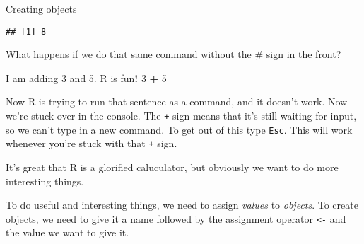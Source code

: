 \documentclass[
  11pt,
  ignorenonframetext,
]{beamer}
\newenvironment{Shaded}{\begin{snugshade}}{\end{snugshade}}
\newcommand{\DecValTok}[1]{\textcolor[rgb]{0.00,0.00,0.81}{#1}}
\newcommand{\FloatTok}[1]{\textcolor[rgb]{0.00,0.00,0.81}{#1}}
\newcommand{\NormalTok}[1]{#1}
\newcommand{\OperatorTok}[1]{\textcolor[rgb]{0.81,0.36,0.00}{\textbf{#1}}}
\newcommand{\StringTok}[1]{\textcolor[rgb]{0.31,0.60,0.02}{#1}}
\begin{document}
\begin{frame}[fragile]{Creating objects}
\begin{verbatim}
## [1] 8
\end{verbatim}

What happens if we do that same command without the \# sign in the
front?

\begin{Shaded}
\begin{Highlighting}[]
\NormalTok{I am adding }\DecValTok{3}\NormalTok{ and }\FloatTok{5.}\NormalTok{ R is fun}\OperatorTok{!}
\DecValTok{3} \OperatorTok{+}\StringTok{ }\DecValTok{5}
\end{Highlighting}
\end{Shaded}

Now R is trying to run that sentence as a command, and it doesn't work.
Now we're stuck over in the console. The \texttt{+} sign means that it's
still waiting for input, so we can't type in a new command. To get out
of this type \texttt{Esc}. This will work whenever you're stuck with
that \texttt{+} sign.

It's great that R is a glorified caluculator, but obviously we want to
do more interesting things.

To do useful and interesting things, we need to assign \emph{values} to
\emph{objects}. To create objects, we need to give it a name followed by
the assignment operator \texttt{\textless{}-} and the value we want to
give it.

\end{frame}
\end{document}

